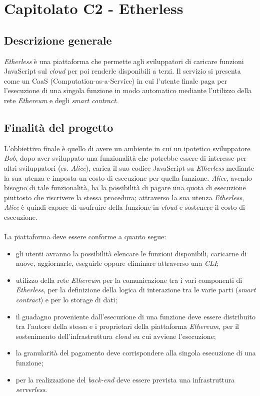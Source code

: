 \section{Capitolato C2 - Etherless}

\subsection{Descrizione generale}
\textit{Etherless} è una piattaforma che permette agli sviluppatori di caricare funzioni JavaScript sul \textit{cloud\glo} per poi renderle disponibili a terzi. Il servizio si presenta come un CaaS (Computation-as-a-Service) in cui l'utente finale paga per l'esecuzione di una singola funzione in modo automatico mediante l'utilizzo della rete \textit{Ethereum\glo} e degli \textit{smart contract\glos}. 
\subsection{Finalità del progetto}
L'obbiettivo finale è quello di avere un ambiente in cui un ipotetico sviluppatore \textit{Bob}, dopo aver sviluppato una funzionalità che potrebbe essere di interesse per altri sviluppatori (es. \textit{Alice}), carica il suo codice JavaScript su \textit{Etherless} mediante la sua utenza e imposta un costo di esecuzione per quella funzione. \textit{Alice}, avendo bisogno di tale funzionalità, ha la possibilità di pagare una quota di esecuzione piuttosto che riscrivere la stessa procedura; attraverso la sua utenza \textit{Etherless}, \textit{Alice} è quindi capace di usufruire della funzione in \textit{cloud\glo} e sostenere il costo di esecuzione.
\\\\
La piattaforma deve essere conforme a quanto segue:
\begin{itemize}
	\item gli utenti avranno la possibilità elencare le funzioni disponibili,  caricarne di nuove, aggiornarle, eseguirle oppure eliminare attraverso una \textit{CLI\glos};
	\item utilizzo della rete \textit{Ethereum\glo} per la comunicazione tra i vari componenti di \textit{Etherless}, per la definizione della logica di interazione tra le varie parti (\textit{smart contract\glos}) e per lo storage di dati;
	\item il guadagno proveniente dall'esecuzione di una funzione deve essere distribuito tra l'autore della stessa e i proprietari della piattaforma \textit{Ethereum\glos}, per il sostenimento dell'infrastruttura \textit{cloud\glo} su cui avviene l'esecuzione;
	\item la granularità del pagamento deve corrispondere alla singola esecuzione di una funzione;
	\item per la realizzazione del \textit{back-end\glo} deve essere prevista una infrastruttura \textit{serverless\glos}.
\end{itemize}

